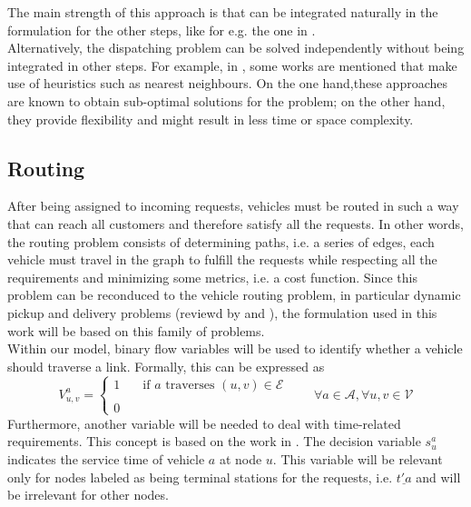  The main strength of this approach is that can be integrated naturally in the formulation for the other steps, like for e.g. the one in . \\
Alternatively, the dispatching problem can be solved independently without being integrated in other steps. For example, in , some works are mentioned that make use of heuristics such as nearest neighbours. On the one hand,these approaches are known to obtain sub-optimal solutions for the problem; on the other hand, they provide flexibility and might result in less time or space complexity. \\


\subsection{Routing}\label{sec:routing}
After being assigned to incoming requests, vehicles must be routed in such a way that can reach all customers and therefore satisfy all the requests. In other words, the routing problem consists of determining paths, i.e. a series of edges, each vehicle must travel in the graph to fulfill the requests while respecting all the requirements and minimizing some metrics, i.e. a cost function. Since this problem can be reconduced to the
vehicle routing problem, in particular dynamic pickup and delivery problems (reviewd by  and ), the formulation used in this work will be based on this family of problems. \\
Within our model, binary flow variables will be used to identify whether a vehicle should traverse a link. Formally, this can be expressed as 
\begin{equation*}
	V_{u,v}^a = 
	\begin{cases} 
		1 & \quad \text{if $a$ traverses } (u,v) \in \mathcal{E}\\
		\\
		0
	\end{cases}
	\quad\quad \forall a \in \mathcal{A}, \forall u,v \in \mathcal{V}
	\label{eq:binary_edges}
\end{equation*}
Furthermore, another variable will be needed to deal with time-related requirements. This concept is based on the work in \cite{inbook_twvrp}. The decision variable $s_{u}^a$ indicates the service time of vehicle $a$ at node $u$. This  variable will be relevant only for nodes labeled as being terminal stations for the requests, i.e. $\underline{t'a}$ and will be irrelevant for other nodes. \\
